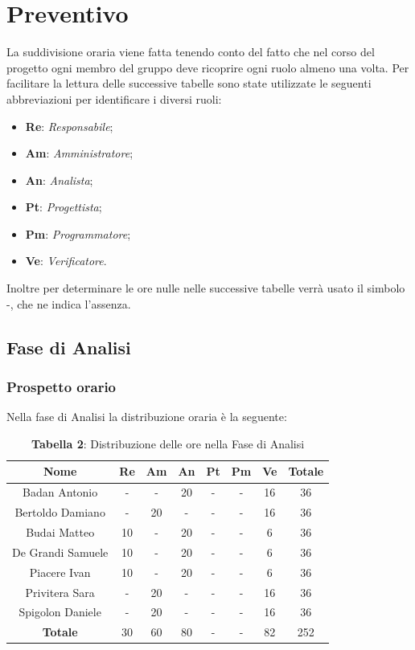 \section{Preventivo}
La suddivisione oraria viene fatta tenendo conto del fatto che nel corso del progetto ogni  membro del gruppo deve ricoprire ogni ruolo almeno una volta.
Per facilitare la lettura delle successive tabelle sono state utilizzate le seguenti abbreviazioni per identificare i diversi ruoli:
\begin{itemize}
	\item \textbf{Re}: \textit{Responsabile};
	\item \textbf{Am}: \textit{Amministratore};
	\item \textbf{An}: \textit{Analista};
	\item \textbf{Pt}: \textit{Progettista};
	\item \textbf{Pm}: \textit{Programmatore};
	\item \textbf{Ve}: \textit{Verificatore}.
\end{itemize}
Inoltre per determinare le ore nulle nelle successive tabelle verrà usato il simbolo -, che ne indica l'assenza.

\subsection{Fase di Analisi}
\subsubsection{Prospetto orario}
Nella fase di Analisi la distribuzione oraria è la seguente:
\begin{table}[H]
	\centering
	\renewcommand{\arraystretch}{1.5}
	\begin{tabular}{|c|c|c|c|c|c|c|c|}
		\hline
		\rowcolor{lighter-grayer}
		Nome & Re & Am & An & Pt & Pm & Ve & Totale\\
		\hline
		
Badan Antonio     & - & - & 20 & - & - & 16 & 36  \\ \hline
Bertoldo Damiano  & - & 20 & - & - & - & 16 & 36  \\ \hline
Budai Matteo      & 10 & - & 20 & - & - & 6  & 36  \\ \hline
De Grandi Samuele & 10 & - & 20 & - & - & 6  & 36  \\ \hline
Piacere Ivan      & 10 & - & 20 & - & - & 6  & 36  \\ \hline
Privitera Sara    & - & 20 & - & - & - & 16 & 36  \\ \hline
Spigolon Daniele  & - & 20 & - & - & - & 16 & 36  \\ \hline
\textbf{Totale}   & 30 & 60 & 80 & - & - & 82 & 252 \\ \hline
		
\end{tabular}
\caption*{\textbf{Tabella 2}: Distribuzione delle ore nella Fase di Analisi\\}
\end{table}	

